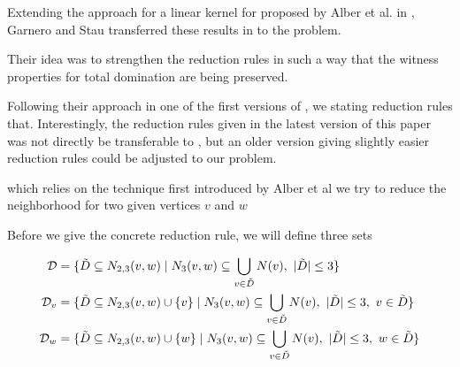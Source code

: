 Extending the approach for a linear kernel for \dom proposed by Alber et al. in \cite{Alber2004}, Garnero and Stau transferred these results in \cite{Garnero2018} to the \tdom problem. 

Their idea was to strengthen the reduction rules in such a way that the witness properties for total domination are being preserved.

Following their approach in one of the first versions of \cite{Garnero2014}, we stating reduction rules that. Interestingly, the reduction rules given in the latest version of this paper was not directly be transferable to \sdom, but an older version giving slightly easier reduction rules could be adjusted to our problem.

which relies on the technique first introduced by Alber et al we try to reduce the neighborhood for two given vertices $v$ and $w$

Before we give the concrete reduction rule, we will define three sets 

\begin{align}
    \mathcal{D} &= \{ \tilde D \subseteq N_{2,3}(v,w)            \mid N_3(v,w) \subseteq \bigcup_{v \in \tilde D} N(v),\ |\tilde D| \leq 3                  \}\\
    \mathcal{D}_{v}  &= \{ \tilde D \subseteq N_{2,3}(v,w) \cup \{v\} \mid N_3(v,w) \subseteq \bigcup_{v \in \tilde D} N(v),\ |\tilde D| \leq 3,\ v \in \tilde D \}\\
    \mathcal{D}_{w}  &= \{ \tilde D \subseteq N_{2,3}(v,w) \cup \{w\} \mid N_3(v,w) \subseteq \bigcup_{v \in \tilde D} N(v),\ |\tilde D| \leq 3,\ w \in \tilde D \}
    \end{align}


